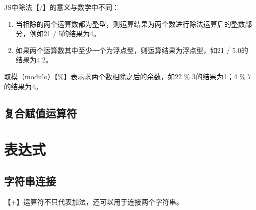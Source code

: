 JS中除法【/】的意义与数学中不同：

\begin{enumerate}
	\item 当相除的两个运算数都为整型，则运算结果为两个数进行除法运算后的整数部分，例如21 / 5的结果为4。

	\item 如果两个运算数其中至少一个为浮点型，则运算结果为浮点型，如21 / 5.0的结果为4.2。
\end{enumerate}

取模（modulo）【\%】表示求两个数相除之后的余数，如22 \% 3的结果为1；4 \% 7的结果为4。\\

\subsection{复合赋值运算符}

\begin{table}[H]
	\centering
	\caption{复合赋值运算符}
\end{table}

\newpage

\section{表达式}

\subsection{字符串连接}

【+】运算符不只代表加法，还可以用于连接两个字符串。\\

\\

